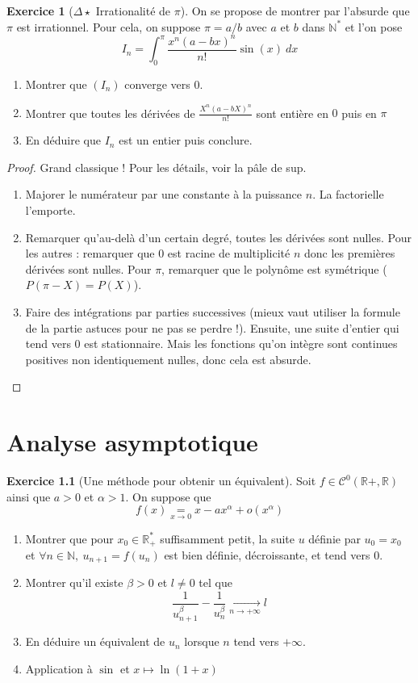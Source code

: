 \documentclass[french]{book}
\newcommand{\N}{\mathbb{N}}
\newcommand{\R}{\mathbb{R}}
\newcommand{\st}{^*}
\theoremstyle{definition}
\newtheorem{ex}{Exercice}[chapter]
\theoremstyle{theorem}
\theoremstyle{remark}
\begin{document}
\begin{ex}[$\Delta\star$ Irrationalité de $\pi$]
	On se propose de montrer par l'absurde que $\pi$ est irrationnel. Pour cela, on suppose $\pi=a/b$ avec $a$ et $b$ dans $\N\st$ et l'on pose $$I_n=\int_{0}^{\pi}\frac{x^n(a-bx)^n}{n!}\sin(x)\ dx$$
	\begin{enumerate}
		\item Montrer que $(I_n)$ converge vers $0$.
		\item Montrer que toutes les dérivées de $\displaystyle \frac{X^n(a-bX)^n}{n!}$ sont entière en $0$ puis en $\pi$
		\item En déduire que $I_n$ est un entier puis conclure.
	\end{enumerate}
\end{ex}

\begin{proof}
	Grand classique ! Pour les détails, voir la pâle de sup.
	\begin{enumerate}
		\item Majorer le numérateur par une constante à la puissance $n$. La factorielle l'emporte.
		\item Remarquer qu'au-delà d'un certain degré, toutes les dérivées sont nulles. Pour les autres : remarquer que $0$ est racine de multiplicité $n$ donc les premières dérivées sont nulles. Pour $\pi$, remarquer que le polynôme est symétrique ($P(\pi-X)=P(X)$).
		\item Faire des intégrations par parties successives (mieux vaut utiliser la formule de la partie astuces pour ne pas se perdre !). Ensuite, une suite d'entier qui tend vers $0$ est stationnaire. Mais les fonctions qu'on intègre sont continues positives non identiquement nulles, donc cela est absurde.
	\end{enumerate}
\end{proof}



\chapter{Analyse asymptotique}

\begin{ex}[Une méthode pour obtenir un équivalent]
	Soit $f \in \mathcal{C}^0(\R+,\R)$ ainsi que $a>0$ et $\alpha>1$. On suppose que $$f(x) \underset{x \longrightarrow 0}{=} x -ax^{\alpha}+o(x^{\alpha})$$
	\begin{enumerate}
		\item Montrer que pour $x_0 \in \R_+\st$ suffisamment petit, la suite $u$ définie par $u_0=x_0$ et $\forall n \in \N, \ u_{n+1}=f(u_n)$ est bien définie, décroissante, et tend vers 0.
		\item Montrer qu'il existe $\beta > 0$ et $l\ne 0$ tel que $$ \frac{1}{u_{n+1}^{\beta}}-\frac{1}{u_{n}^{\beta}} \xrightarrow[n\to+\infty]{}l$$
		\item En déduire un équivalent de $u_n$ lorsque $n$ tend vers $+\infty$.
		\item Application à $\sin$ et $x \mapsto\ln(1+x)$
	\end{enumerate}
\end{ex}
\end{document}
